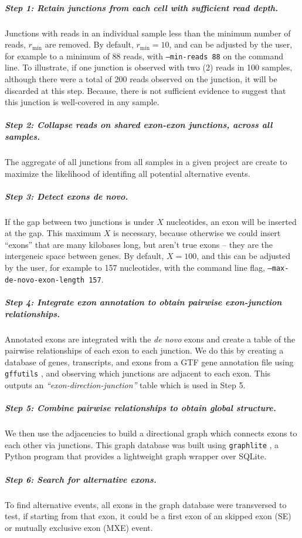 \subparagraph{Step 1: Retain junctions from each cell with sufficient read depth.} Junctions with reads in an individual sample less than the minimum number of reads, $r_{\min}$ are removed. By default, $r_{\min} = 10$, and can be adjusted by the user, for example to a minimum of 88 reads, with \texttt{--min-reads~88} on the command line. To illustrate, if one junction is observed with two (2) reads in 100 samples, although there were a total of 200 reads observed on the junction, it will be discarded at this step. Because, there is not sufficient evidence to suggest that this junction is well-covered in any sample. 

\subparagraph{Step 2: Collapse reads on shared exon-exon junctions, across all samples.} The aggregate of all junctions from all samples in a given project are create to maximize the likelihood of identifing all potential alternative events.

\subparagraph{Step 3: Detect exons \emph{de novo}.} If the gap between two junctions is under $X$ nucleotides, an exon will be inserted at the gap. This maximum $X$ is necessary, because otherwise we could insert ``exons'' that are many kilobases long, but aren't true exons -- they are the intergeneic space between genes. By default, $X = 100$, and this can be adjusted by the user, for example to 157 nucleotides, with the command line flag, \texttt{--max-de-novo-exon-length~157}.

\subparagraph{Step 4: Integrate exon annotation to obtain pairwise exon-junction relationships.} Annotated exons are integrated with the \emph{de novo} exons and create a table of the pairwise relationships of each exon to each junction. We do this by creating a database of genes, transcripts, and exons from a GTF gene annotation file using \texttt{gffutils} \cite{Anonymous:sP8uhXuv}, and observing which junctions are adjacent to each exon. This outputs an \emph{``exon-direction-junction''} table which is used in Step 5.

\subparagraph{Step 5: Combine pairwise relationships to obtain global structure.} We then use the adjacencies to build a directional graph which connects exons to each other via junctions. This graph database was built using \texttt{graphlite} \cite{Anonymous:vt}, a Python program that provides a lightweight graph wrapper over SQLite.

\subparagraph{Step 6: Search for alternative exons.} To find alternative events, all exons in the graph database were transversed to test, if starting from that exon, it could be a first exon of an skipped exon (SE) or mutually exclusive exon (MXE) event. 

